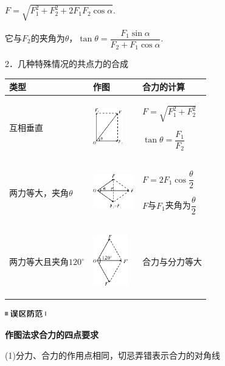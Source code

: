\documentclass[cn,10.5pt,chinese,mac,chinesefont=founder]{elegantbook}
\begin{document}
$F=\sqrt{F_1^2+F_2^2+2F_1F_2\cos\alpha}$.

它与$F_2$的夹角为$\theta$，$\tan \theta=\dfrac{F_1\sin\alpha}{F_2+F_1\cos\alpha}$.

2．几种特殊情况的共点力的合成

\begin{longtable}[]{@{}m{4cm}m{3cm}m{3cm}@{}}
\toprule
类型 & 作图 & 合力的计算\tabularnewline
\midrule
\endhead

互相垂直& \begin{center}\includegraphics[width=0.5in]{media/image65.png}\end{center}&
$F=\sqrt{F_1^2+F_2^2}$

$\tan\theta=\dfrac{F_1}{F_2}$\tabularnewline

两力等大，夹角$\theta$ &
\begin{center}\includegraphics[width=0.7in,]{media/image66.png}\end{center}
&
$F=2F_1\cos\dfrac{\theta}{2}$

$F$与$F_1$夹角为$\dfrac{\theta}{2}$\tabularnewline
两力等大且夹角$120^\circ$ &
\begin{center}
	\includegraphics[width=0.6in]{media/image67.png}
\end{center}
 &
合力与分力等大\tabularnewline
\bottomrule
\end{longtable}

\begin{center}\includegraphics[width=0.70833in,height=0.125in]{media/image34.png}

\textbf{作图法求合力的四点要求}
\end{center}


(1)分力、合力的作用点相同，切忌弄错表示合力的对角线
\end{document}
